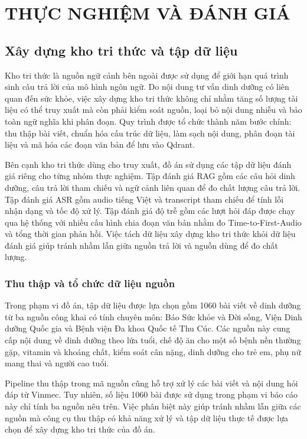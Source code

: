 \documentclass[a4paper,13pt,twoside]{report}
\begin{document}
\chapter{THỰC NGHIỆM VÀ ĐÁNH GIÁ}

\section{Xây dựng kho tri thức và tập dữ liệu}

Kho tri thức là nguồn ngữ cảnh bên ngoài được sử dụng để giới hạn quá trình sinh câu trả lời của mô hình ngôn ngữ. Do nội dung tư vấn dinh dưỡng có liên quan đến sức khỏe, việc xây dựng kho tri thức không chỉ nhằm tăng số lượng tài liệu có thể truy xuất mà còn phải kiểm soát nguồn, loại bỏ nội dung nhiễu và bảo toàn ngữ nghĩa khi phân đoạn. Quy trình được tổ chức thành năm bước chính: thu thập bài viết, chuẩn hóa cấu trúc dữ liệu, làm sạch nội dung, phân đoạn tài liệu và mã hóa các đoạn văn bản để lưu vào Qdrant.

Bên cạnh kho tri thức dùng cho truy xuất, đồ án sử dụng các tập dữ liệu đánh giá riêng cho từng nhóm thực nghiệm. Tập đánh giá RAG gồm các câu hỏi dinh dưỡng, câu trả lời tham chiếu và ngữ cảnh liên quan để đo chất lượng câu trả lời. Tập đánh giá ASR gồm audio tiếng Việt và transcript tham chiếu để tính lỗi nhận dạng và tốc độ xử lý. Tập đánh giá độ trễ gồm các lượt hỏi đáp được chạy qua hệ thống với nhiều cấu hình chia đoạn văn bản nhằm đo Time-to-First-Audio và tổng thời gian phản hồi. Việc tách dữ liệu xây dựng kho tri thức khỏi dữ liệu đánh giá giúp tránh nhầm lẫn giữa nguồn trả lời và nguồn dùng để đo chất lượng.

\subsection{Thu thập và tổ chức dữ liệu nguồn}

Trong phạm vi đồ án, tập dữ liệu được lựa chọn gồm 1060 bài viết về dinh dưỡng từ ba nguồn công khai có tính chuyên môn: Báo Sức khỏe và Đời sống, Viện Dinh dưỡng Quốc gia và Bệnh viện Đa khoa Quốc tế Thu Cúc. Các nguồn này cung cấp nội dung về dinh dưỡng theo lứa tuổi, chế độ ăn cho một số bệnh nền thường gặp, vitamin và khoáng chất, kiểm soát cân nặng, dinh dưỡng cho trẻ em, phụ nữ mang thai và người cao tuổi.

Pipeline thu thập trong mã nguồn cũng hỗ trợ xử lý các bài viết và nội dung hỏi đáp từ Vinmec. Tuy nhiên, số liệu 1060 bài được sử dụng trong phạm vi báo cáo này chỉ tính ba nguồn nêu trên. Việc phân biệt này giúp tránh nhầm lẫn giữa các nguồn mà công cụ thu thập có khả năng xử lý và tập dữ liệu thực tế được lựa chọn để xây dựng kho tri thức của đồ án.
\end{document}

